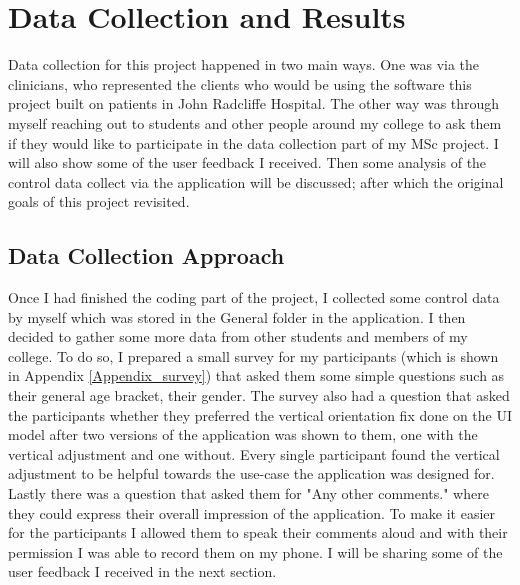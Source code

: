 \chapter{Data Collection and Results}

\label{Chapter7_dataCollection} 

Data collection for this project happened in two main ways. One was via the clinicians, who represented the clients who would be using the software this project built on patients in John Radcliffe Hospital. The other way was through myself reaching out to students and other people around my college to ask them if they would like to participate in the data collection part of my MSc project. I will also show some of the user feedback I received. Then some analysis of the control data collect via the application will be discussed; after which the original goals of this project revisited. 

\section{Data Collection Approach}

Once I had finished the coding part of the project, I collected some control data by myself which was stored in the General folder in the application. I then decided to gather some more data from other students and members of my college. To do so, I prepared a small survey for my participants (which is shown in Appendix \ref{Appendix_survey}) that asked them some simple questions such as their general age bracket, their gender. The survey also had a question that asked the participants whether they preferred the vertical orientation fix done on the UI model after two versions of the application was shown to them, one with the vertical adjustment and one without. Every single participant found the vertical adjustment to be helpful towards the use-case the application was designed for. Lastly there was a question that asked them for "Any other comments." where they could express their overall impression of the application. To make it easier for the participants I allowed them to speak their comments aloud and with their permission I was able to record them on my phone. I will be sharing some of the user feedback I received in the next section. 

